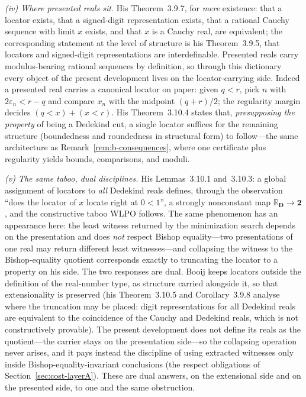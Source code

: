 \documentclass[11pt]{article}
\theoremstyle{definition}
\theoremstyle{remark}
\begin{document}
\emph{(iv) Where presented reals sit.}  His Theorem~3.9.7, for \emph{mere} existence: that a locator exists, that a signed-digit representation exists, that a rational Cauchy sequence with limit $x$ exists, and that $x$ is a Cauchy real, are equivalent; the corresponding statement at the level of structure is his Theorem~3.9.5, that locators and signed-digit representations are interdefinable.  Presented reals carry modulus-bearing rational sequences by definition, so through this dictionary every object of the present development lives on the locator-carrying side.  Indeed a presented real carries a canonical locator on paper: given $q<r$, pick $n$ with $2\varepsilon_n<r-q$ and compare $x_n$ with the midpoint $(q+r)/2$; the regularity margin decides $(q<x)+(x<r)$.  His Theorem~3.10.4 states that, \emph{presupposing the property} of being a Dedekind cut, a single locator suffices for the remaining structure (boundedness and roundedness in structural form) to follow---the same architecture as Remark~\ref{rem:b-consequences}, where one certificate plus regularity yields bounds, comparisons, and moduli.

\emph{(v) The same taboo, dual disciplines.}  His Lemmas~3.10.1 and~3.10.3: a global assignment of locators to \emph{all} Dedekind reals defines, through the observation ``does the locator of $x$ locate right at $0<1$'', a strongly nonconstant map $\mathbb{R}_{\mathbf{D}}\to\mathbf{2}$, and the constructive taboo WLPO follows.  The same phenomenon has an appearance here: the least witness returned by the minimization search depends on the presentation and does \emph{not} respect Bishop equality---two presentations of one real may return different least witnesses---and collapsing the witness to the Bishop-equality quotient corresponds exactly to truncating the locator to a property on his side.  The two responses are dual.  Booij keeps locators outside the definition of the real-number type, as structure carried alongside it, so that extensionality is preserved (his Theorem~3.10.5 and Corollary~3.9.8 analyse where the truncation may be placed: digit representations for all Dedekind reals are equivalent to the coincidence of the Cauchy and Dedekind reals, which is not constructively provable).  The present development does not define its reals as the quotient---the carrier stays on the presentation side---so the collapsing operation never arises, and it pays instead the discipline of using extracted witnesses only inside Bishop-equality-invariant conclusions (the respect obligations of Section~\ref{sec:cost-layerA}).  These are dual answers, on the extensional side and on the presented side, to one and the same obstruction.
\end{document}
